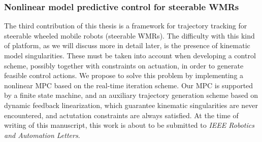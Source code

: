 \subsubsection{Nonlinear model predictive control for steerable WMRs}
The third contribution of this thesis is a framework for trajectory tracking 
for steerable wheeled mobile robots (steerable WMRs).
The difficulty with this kind of platform,
as we will discuss more in detail later, is the presence of kinematic model 
singularities. These must be taken into account when developing a control 
scheme, possibly together with constraints on actuation, in order to generate
feasible control actions. We propose to solve this problem by implementing a 
nonlinear MPC based on the real-time iteration scheme. Our MPC is supported by a 
finite state machine, and an auxiliary trajectory generation scheme based 
on dynamic feedback linearization, which guarantee kinematic singularities 
are never encountered, and actutation constraints are always satisfied.
At the time of writing of this manuscript, this work is about to be 
submitted to \textit{IEEE Robotics and Automation Letters}.

